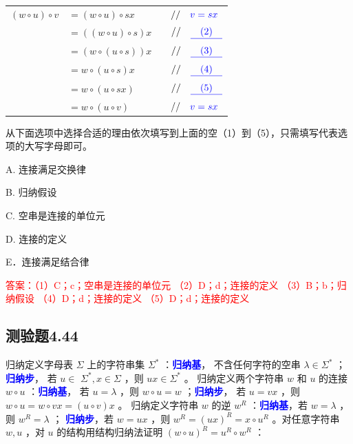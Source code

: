 \documentclass[UTF8, heading=true]{ctexart}
\begin{document}
\begin{table}[H]
  \renewcommand{\arraystretch}{1.5}
  \centering
\begin{tabular}{rlrl}
  $(w \circ u) \circ v$ & $=(w \circ u) \circ s x$ & & $/ / \quad \textcolor{blue}{v = s x}$ \\
  & $=((w \circ u) \circ s) x$ & & $/ / \quad \textcolor{blue}{\underline{\quad (2) \quad}}$ \\
  & $=(w \circ(u \circ s)) x$ & & $/ / \quad  \textcolor{blue}{\underline{\quad (3) \quad}}$ \\
  & $=w \circ(u \circ s) x$ & & $/ / \quad \textcolor{blue}{\underline{\quad (4) \quad}}$ \\
  & $=w \circ(u \circ s x)$ & & $/ / \quad \textcolor{blue}{\underline{\quad (5) \quad}}$ \\
  & $=w \circ(u \circ v)$ & & $ / / \quad \textcolor{blue}{v = s x}$
\end{tabular}
\end{table}

从下面选项中选择合适的理由依次填写到上面的空（1）到（5），只需填写代表选项的大写字母即可。

A. 连接满足交换律

B. 归纳假设

C. 空串是连接的单位元

D. 连接的定义

E．连接满足结合律

\textcolor{red}{答案：（1）C；c；空串是连接的单位元
（2）D；d；连接的定义
（3）B；b；归纳假设
（4）D；d；连接的定义
（5）D；d；连接的定义}

\subsection{测验题4.44}

归纳定义字母表 $\Sigma$ 上的字符串集 $\Sigma^*$ ：\textcolor{blue}{\textbf{归纳基}}，
不含任何字符的空串 $\lambda \in \Sigma^*$ ；\textcolor{blue}{\textbf{归纳步}}，
若 $u \in$ $\Sigma^*, x \in \Sigma$ ，则 $u x \in \Sigma^*$ 。
归纳定义两个字符串 $w$ 和 $u$ 的连接 $w \circ u$ ：\textcolor{blue}{\textbf{归纳基}}，
若 $u=\lambda$ ，则 $w \circ u=w$ ；\textcolor{blue}{\textbf{归纳步}}，
若 $u=v x$ ，则 $w \circ u=w \circ v x=(u \circ v) x$ 。
归纳定义字符串 $w$ 的逆 $w^R$ ：\textcolor{blue}{\textbf{归纳基}}，若 $w=\lambda$ ，则 $w^R=\lambda$ ；
\textcolor{blue}{\textbf{归纳步}}，若 $w=u x$ ，则 $w^R=(u x)^R=x \circ u^R$ 。对任意字符串 $w, u$ ，对 $u$ 的结构用结构归纳法证明 $(w \circ u)^R=u^R \circ w^R$ ：
\end{document}
